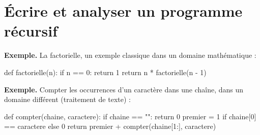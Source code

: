 
\section{Écrire et analyser un programme récursif}



\textbf{Exemple.} La factorielle, un exemple classique dans un domaine mathématique :
\begin{python}
def factorielle(n):
    if n == 0:
        return 1
    return n * factorielle(n - 1)
\end{python}

\textbf{Exemple.} Compter les occurrences d'un caractère dans une chaîne, dans un domaine différent (traitement de texte) :
\begin{python}
def compter(chaine, caractere):
    if chaine == "":
        return 0
    premier = 1 if chaine[0] == caractere else 0
    return premier + compter(chaine[1:], caractere)
\end{python}

%



